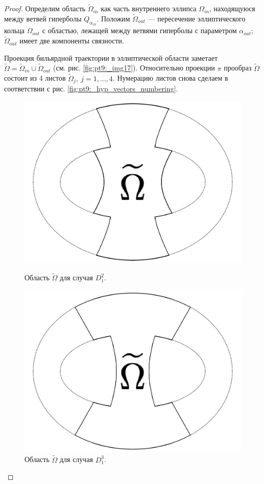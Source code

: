 \begin{proof}
Определим область $\widetilde{\Omega}_{in}$ как часть внутреннего эллипса $\Omega_{in}$, находящуюся между ветвей гиперболы $Q_{\alpha_{in}}$. Положим $\widetilde{\Omega}_{out}$ --- пересечение эллиптического кольца $\Omega_{out}$ с областью, лежащей между ветвями гиперболы с параметром $\alpha_{out}$; $\widetilde{\Omega}_{out}$ имеет две компоненты связности.

Проекция бильярдной траектории в эллиптической области заметает $\widetilde{\Omega} = \widetilde{\Omega}_{in} \cup \widetilde{\Omega}_{out}$ (см. рис.     \ref{fig:pt9:_img17}). Относительно проекции $\pi$ прообраз $\widetilde{\Omega}$ состоит из 4 листов $\widetilde{\Omega}_j, \ j=1, \ldots, 4$. 
Нумерацию листов снова сделаем в соответствии с рис. \ref{fig:pt9:_hyp_vectors_numbering}.

\begin{figure}[!htb]
\centering
\includegraphics[width=0.7\linewidth]{images/section2/img17.pdf}
    \caption{Область $\widetilde{\Omega}$ для случая $D_1^2$.}
    \label{fig:pt9:_img17}
\endminipage\hfill
{}
\centering
\includegraphics[width=0.7\linewidth]{images/section2/img18.pdf}
    \caption{Область $\widetilde{\Omega}$ для случая $D_1^3$.}
    \label{fig:pt9:_img18}
\endminipage\hfill
\end{figure}





\end{proof}
